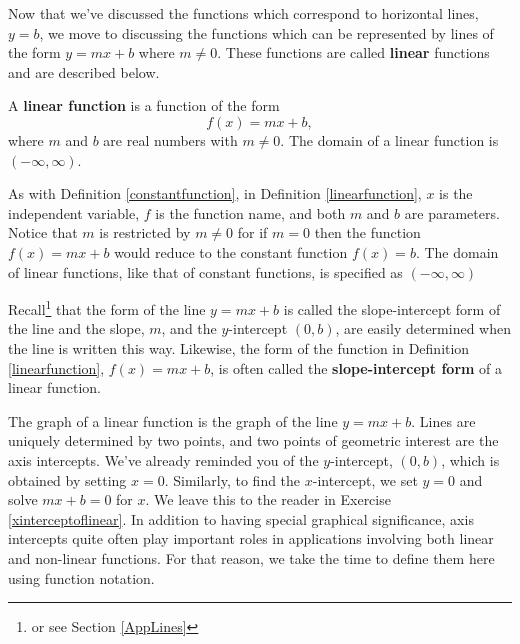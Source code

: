 \documentclass{ximera}
\begin{document}
	\author{Stitz-Zeager}
\begin{abstract}
\end{abstract}
\label{ConstantandLinearFunctions}

Now that we've discussed the functions which correspond to horizontal lines, $y = b$, we move to discussing the functions which can be represented by lines of the form $y = mx + b$ where $m \neq 0$.  These functions are called \textbf{linear} functions and are described below.

\begin{definition}\label{linearfunction} A \textbf{linear function} is a function of the form \[ f(x) = mx + b,\] where $m$ and $b$ are real numbers with $m \neq 0$.  The domain of a linear function is $(-\infty, \infty)$.
\end{definition}







As with Definition \ref{constantfunction},  in Definition \ref{linearfunction}, $x$ is the independent variable, $f$ is the function name, and both $m$ and $b$ are parameters.  Notice that $m$ is restricted by $m \neq 0$ for if $m = 0$ then the function $f(x) = mx + b$ would reduce to the constant function $f(x) = b$.  The domain of linear functions, like that of constant functions,  is specified as $(-\infty, \infty)$



Recall\footnote{or see Section \ref{AppLines}} that the form of the line $y = mx + b$ is called the slope-intercept form of the line and the slope,  $m$, and the $y$-intercept $(0, b)$, are easily determined when the line is written this way. Likewise, the form of the function in Definition \ref{linearfunction}, $f(x) = mx + b$, is often called the  \textbf{slope-intercept form} of a linear function.



The graph of a linear function is the graph of the line  $y = mx + b$.   Lines are uniquely determined by two points, and two points of geometric interest are the axis intercepts.  We've already reminded you of the $y$-intercept, $(0,b)$, which is obtained by setting $x = 0$. Similarly, to find the $x$-intercept, we set $y = 0$ and solve $mx + b = 0$ for $x$.  We leave this to the reader in Exercise \ref{xinterceptoflinear}.  In addition to having special graphical significance, axis intercepts quite often play important roles in applications involving both linear and non-linear functions.   For that reason, we take the time to define them here using function notation.
\end{document}
